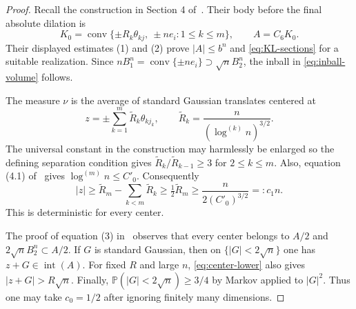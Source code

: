 \documentclass[11pt]{article}
\begin{document}
\begin{proof}
Recall the construction in Section 4 of~\cite{KL}. Their body before the final
absolute dilation is
\[
 K_0=\operatorname{conv}\{\pm R_k\theta_{kj},\ \pm ne_i:1\leq k\leq m\},
 \qquad A=C_6K_0.
\]
Their displayed estimates (1) and (2) prove $|A|\leq b^n$ and
\eqref{eq:KL-sections} for a suitable realization. Since
$nB_1^n=\operatorname{conv}\{\pm ne_i\}\supset\sqrt nB_2^n$, the inball in
\eqref{eq:inball-volume} follows.

The measure $\nu$ is the average of standard Gaussian translates centered at
\begin{equation}\label{eq:centers}
 z=\pm\sum_{k=1}^m\widetilde R_k\theta_{kj_k},\qquad
 \widetilde R_k=\frac{n}{(\log^{(k)}n)^{3/2}}.
\end{equation}
The universal constant in the construction may harmlessly be enlarged so the
defining separation condition gives
$\widetilde R_k/\widetilde R_{k-1}\geq3$ for $2\leq k\leq m$. Also,
equation (4.1) of~\cite{KL} gives $\log^{(m)}n\leq C'_0$. Consequently
\begin{equation}\label{eq:center-lower}
 |z|\geq\widetilde R_m-\sum_{k<m}\widetilde R_k
 \geq\tfrac12\widetilde R_m\geq\frac{n}{2(C'_0)^{3/2}}=:c_1n.
\end{equation}
This is deterministic for every center.

The proof of equation (3) in~\cite{KL} observes that every center belongs to
$A/2$ and $2\sqrt nB_2^n\subset A/2$. If $G$ is standard Gaussian, then on
$\{|G|<2\sqrt n\}$ one has $z+G\in\operatorname{int}(A)$. For fixed $R$ and
large $n$, \eqref{eq:center-lower} also gives $|z+G|>R\sqrt n$. Finally,
$\mathbb P(|G|<2\sqrt n)\geq3/4$ by Markov applied to $|G|^2$. Thus one may
take $c_0=1/2$ after ignoring finitely many dimensions.
\end{proof}
\end{document}

